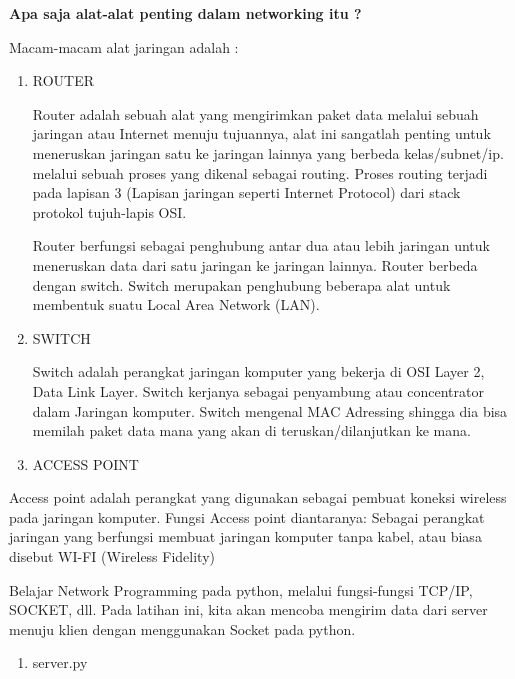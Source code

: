 \textbf{Apa saja alat-alat penting dalam networking itu ?} \par
\noindent 
Macam-macam alat jaringan adalah :  \par
\noindent 
\begin{enumerate}
\item ROUTER  \par
Router adalah sebuah alat yang mengirimkan paket data melalui sebuah jaringan atau Internet menuju tujuannya, alat ini sangatlah penting untuk meneruskan jaringan satu ke jaringan lainnya yang berbeda kelas/subnet/ip. melalui sebuah proses yang dikenal sebagai routing. Proses routing terjadi pada lapisan 3 (Lapisan jaringan seperti Internet Protocol) dari stack protokol tujuh-lapis OSI. \par
\vspace{12pt}
Router berfungsi sebagai penghubung antar dua atau lebih jaringan untuk meneruskan data dari satu jaringan ke jaringan lainnya. Router berbeda dengan switch. Switch merupakan penghubung beberapa alat untuk membentuk suatu Local Area Network (LAN). \par
\vspace{12pt}
\noindent 
\item SWITCH \par
Switch adalah perangkat jaringan komputer yang bekerja di OSI Layer 2, Data Link Layer. Switch kerjanya sebagai penyambung atau concentrator dalam Jaringan komputer. Switch mengenal MAC Adressing shingga dia bisa memilah paket data mana yang akan di teruskan/dilanjutkan ke mana. \par
\vspace{12pt}
\noindent 
\item ACCESS POINT\end{enumerate}
 \par
Access point adalah perangkat yang digunakan sebagai pembuat koneksi wireless pada jaringan komputer. Fungsi Access point diantaranya: Sebagai perangkat jaringan yang berfungsi membuat jaringan komputer tanpa kabel, atau biasa disebut WI-FI (Wireless Fidelity) \par
Belajar Network Programming pada python, melalui fungsi-fungsi TCP/IP, SOCKET, dll. Pada latihan ini, kita akan mencoba mengirim data dari server menuju klien dengan menggunakan Socket pada python. \par
\noindent 
\begin{enumerate}
\item server.py\end{enumerate}
 \par

